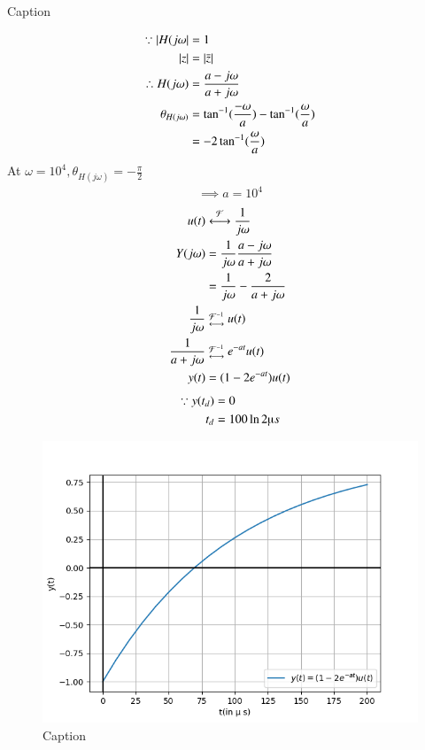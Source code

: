 \documentclass[journal,12pt,twocolumn]{IEEEtran}
\theoremstyle{remark}
\begin{document}
\solution 
\begin{table}[!h]
    \centering
    
    \caption{Caption}
    \label{tab:my_label}
\end{table}
\begin{align}
    \because \left\vert H(j\omega\right\vert &= 1\\
    \left\vert z\right\vert &= \left\vert\bar{z}\right\vert\\
    \therefore H(j\omega) &= \frac{a - j\omega}{a + j\omega}\\
    \theta_{H(j\omega)} &= \tan^{-1}(\frac{-\omega}{a}) - \tan^{-1}(\frac{\omega}{a})\\
    &= -2 \tan^{-1}(\frac{\omega}{a})
\end{align}
At $\omega = 10^4, \theta_{H(j\omega)} = -\frac{\pi}{2}$
\begin{align}
    \implies a = 10^4 
\end{align}
\begin{align}
    u(t) &\system{\mathcal{F}} \frac{1}{j\omega}\\
    Y(j\omega) &= \frac{1}{j\omega} \frac{a - j\omega}{a + j\omega}\\
    &= \frac{1}{j\omega} - \frac{2}{a + j\omega}\\
    \frac{1}{j\omega} &\mathrel{\substack{\mathcal{F}^{-1}\\\longleftrightarrow}} u(t)\\
    \frac{1}{a + j\omega} &\mathrel{\substack{\mathcal{F}^{-1}\\\longleftrightarrow}} e^{-at} u(t) \\
    y(t) &= (1-2e^{-at}) u(t)
\end{align}
\begin{align}
    \because y(t_d) &= 0 \\
    t_d &= 100 \ln{2} \micro s 
\end{align}
\begin{figure}[!h]
    \centering
    \includegraphics[width=\columnwidth]{figs/graph.png}
    \caption{Caption}
    \label{fig:enter-label}
\end{figure}
\end{document}
